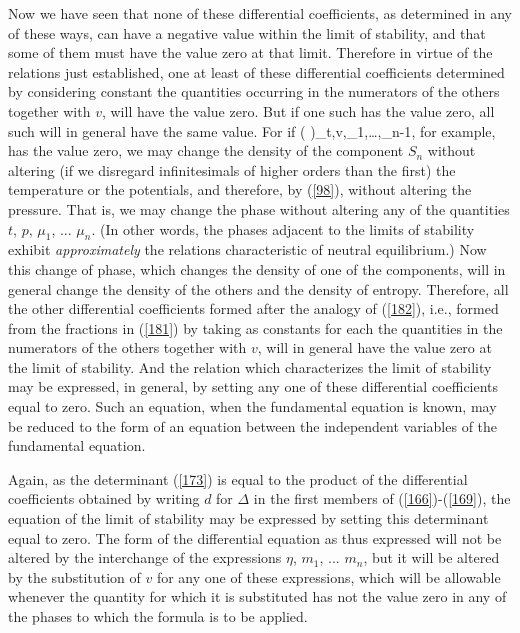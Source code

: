 \documentclass[12pt]{article}
\begin{document}
Now we have seen that none of these differential coefficients, as determined in any of these ways, can have a negative value within the limit of stability, and that some of them must have the value zero at that limit. Therefore in virtue of the relations just established, one at least of these differential coefficients determined by considering
constant the quantities occurring in the numerators of the others together with $v$, will have the value zero. But if one such has the value zero, all such will in general have the same value. For if
\eqs \left( \right)_{t,v,\mu_1,\dots,\mu_{n-1}}, \label{182}\eqe
for example, has the value zero, we may change the density of the component $S_n$ without altering (if we disregard infinitesimals of higher orders than the first) the temperature or the potentials, and therefore, by (\ref{98}), without altering the pressure. That is, we may change the phase without altering any of the quantities $t$, $p$, $\mu_1$, ... $\mu_n$. (In other words, the phases adjacent to the limits of stability exhibit \textit{approximately} the relations characteristic of neutral equilibrium.) Now this change of phase, which changes the density of one of the components, will in general change the density of the others and the density of entropy.  Therefore, all the other differential coefficients formed after the analogy of (\ref{182}), i.e., formed from the fractions in (\ref{181}) by taking as constants for each the quantities in the numerators of the others together with $v$, will in general have the value zero at the limit of stability.  And the relation which characterizes the limit of stability may be expressed, in general, by setting any one of these differential coefficients equal to zero. Such an equation, when the fundamental equation is known, may be reduced to the form of an equation between the independent variables of the fundamental equation.


Again, as the determinant (\ref{173}) is equal to the product of the differential coefficients obtained by writing $d$ for $\Delta$ in the first members of (\ref{166})-(\ref{169}), the equation of the limit of stability may be expressed by setting this determinant equal to zero. The form of the differential equation as thus expressed will not be altered by the interchange of the expressions $\eta$, $m_1$, ... $m_n$, but it will be altered by the substitution of $v$ for any one of these expressions, which will be allowable whenever the quantity for which it is substituted has not the value zero in any of the phases to which the formula is to be applied.
\end{document}

